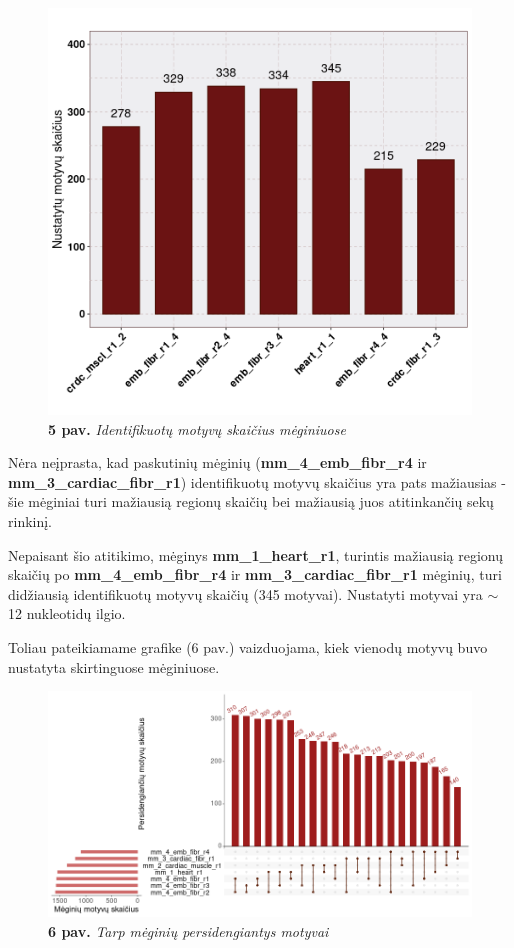 \documentclass[12pt]{article}
\begin{document}
\begin{figure}[htb]
    \begin{center}
        \includegraphics[width=0.7\linewidth]{Figures/motifs_in_samples.png}
        \caption*{\textbf{5 pav.} \emph{Identifikuotų motyvų skaičius mėginiuose}}
    \end{center}
\end{figure}

Nėra neįprasta, kad paskutinių mėginių (\textbf{mm\_4\_emb\_fibr\_r4} ir
\textbf{mm\_3\_cardiac\_fibr\_r1}) identifikuotų motyvų skaičius yra pats
mažiausias - šie mėginiai turi mažiausią regionų skaičių bei 
mažiausią juos atitinkančių sekų rinkinį.

Nepaisant šio atitikimo, mėginys \textbf{mm\_1\_heart\_r1}, turintis
mažiausią regionų skaičių po \textbf{mm\_4\_emb\_fibr\_r4} ir
\textbf{mm\_3\_cardiac\_fibr\_r1} mėginių, turi didžiausią identifikuotų
motyvų skaičių (345 motyvai). Nustatyti motyvai yra \( \sim \)12
nukleotidų ilgio.

Toliau pateikiamame grafike (6 pav.) vaizduojama, kiek vienodų
motyvų buvo nustatyta skirtinguose mėginiuose.

\newpage

\begin{figure}[htb]
    \begin{center}
        \includegraphics[width=1\linewidth]{Figures/motif_intersections.png}
        \caption*{\textbf{6 pav.} \emph{Tarp mėginių persidengiantys motyvai}}
    \end{center}
\end{figure}
\end{document}
